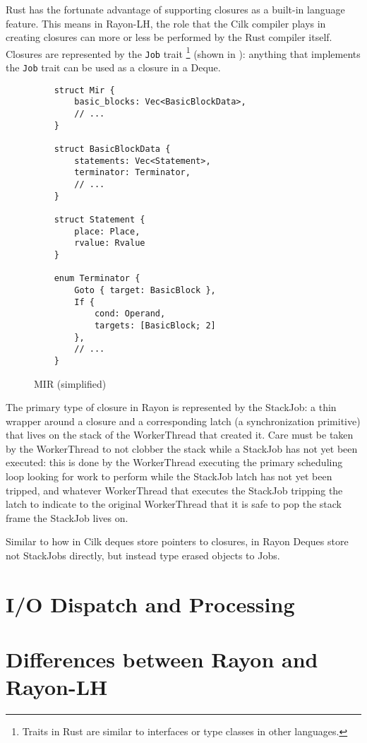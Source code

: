 \documentclass[bsc,frontabs,singlespacing,parskip,deptreport,normalheadings]{infthesis}
\begin{document}
Rust has the fortunate advantage of supporting closures as a built-in language
feature. This means in Rayon-LH, the role that the Cilk compiler plays in
creating closures can more or less be performed by the Rust compiler itself.
Closures are represented by the \texttt{Job} trait \footnote{Traits in Rust are
similar to interfaces or type classes in other languages.} (shown in   ): anything that
implements the \texttt{Job} trait can be used as a closure in a Deque.

\begin{figure}[ht]
  \caption{MIR (simplified)}
  \label{fig:mir}
  \begin{verbatim}
    struct Mir {
        basic_blocks: Vec<BasicBlockData>,
        // ...
    }

    struct BasicBlockData {
        statements: Vec<Statement>,
        terminator: Terminator,
        // ...
    }

    struct Statement {
        place: Place,
        rvalue: Rvalue
    }

    enum Terminator {
        Goto { target: BasicBlock },
        If {
            cond: Operand,
            targets: [BasicBlock; 2]
        },
        // ...
    }
  \end{verbatim}
\end{figure}

The primary type of closure in Rayon is represented by the StackJob: a thin
wrapper around a closure and a corresponding latch (a synchronization primitive)
that lives on the stack of the WorkerThread that created it. Care must be taken
by the WorkerThread to not clobber the stack while a StackJob has not yet been
executed: this is done by the WorkerThread executing the primary scheduling loop
looking for work to perform while the StackJob latch has not yet been tripped,
and whatever WorkerThread that executes the StackJob tripping the latch to
indicate to the original WorkerThread that it is safe to pop the stack frame the
StackJob lives on.

Similar to how in Cilk deques store pointers to closures, in Rayon Deques store
not StackJobs directly, but instead type erased objects to Jobs. 

\section{I/O Dispatch and Processing}
\label{section:i/o_dispatch_and_processing}

\section{Differences between Rayon and Rayon-LH}
\end{document}
